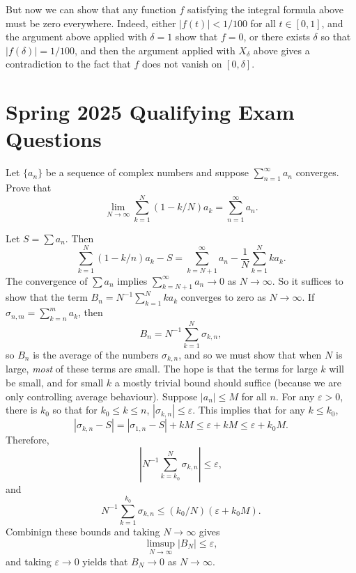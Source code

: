 \documentclass[answers]{exam}
\begin{document}
\begin{questions}
\begin{solution}
	But now we can show that any function $f$ satisfying the integral formula above must be zero everywhere. Indeed, either $|f(t)| < 1/100$ for all $t \in [0,1]$, and the argument above applied with $\delta = 1$ show that $f = 0$, or there exists $\delta$ so that $|f(\delta)| = 1/100$, and then the argument applied with $X_\delta$ above gives a contradiction to the fact that $f$ does not vanish on $[0,\delta]$.
\end{solution}







\newpage
\section{Spring 2025 Qualifying Exam Questions}

\question Let $\{ a_n \}$ be a sequence of complex numbers and suppose $\sum_{n = 1}^\infty a_n$ converges. Prove that
%
\[ \lim_{N \to \infty} \sum_{k = 1}^N (1 - k/N) a_k = \sum_{n = 1}^\infty a_n. \]
\begin{solution}
	Let $S = \sum a_n$. Then
	\[ \sum_{k = 1}^N (1 - k/n) a_k - S = \sum_{k = N+1}^\infty a_n - \frac{1}{N} \sum_{k = 1}^N k a_k. \]
	The convergence of $\sum a_n$ implies $\sum_{k = N+1}^\infty a_n \to 0$ as $N \to \infty$. So it suffices to show that the term $B_n = N^{-1} \sum_{k = 1}^N k a_k$ converges to zero as $N \to \infty$. If $\sigma_{n,m} = \sum_{k = n}^m a_k$, then
	\[ B_n = N^{-1} \sum_{k = 1}^N \sigma_{k,n}, \]
	so $B_n$ is the average of the numbers $\sigma_{k,n}$, and so we must show that when $N$ is large, \emph{most} of these terms are small. The hope is that the terms for large $k$ will be small, and for small $k$ a mostly trivial bound should suffice (because we are only controlling average behaviour). Suppose $|a_n| \leq M$ for all $n$. For any $\varepsilon > 0$, there is $k_0$ so that for $k_0 \leq k \leq n$, $|\sigma_{k,n}| \leq \varepsilon$. This implies that for any $k \leq k_0$,
	\[ |\sigma_{k,n} - S| = |\sigma_{1,n} - S| + k M \leq \varepsilon + k M \leq \varepsilon + k_0 M. \]
	Therefore,
	\[ |N^{-1} \sum_{k = k_0}^N \sigma_{k,n}| \leq \varepsilon, \]
	and
	\[ N^{-1} \sum_{k = 1}^{k_0} \sigma_{k,n} \leq (k_0/N) (\varepsilon + k_0 M). \]
	Combinign these bounds and taking $N \to \infty$ gives
	\[ \limsup_{N \to \infty} |B_N| \leq \varepsilon, \]
	and taking $\varepsilon \to 0$ yields that $B_N \to 0$ as $N \to \infty$.
\end{solution}


\end{questions}
\end{document}
